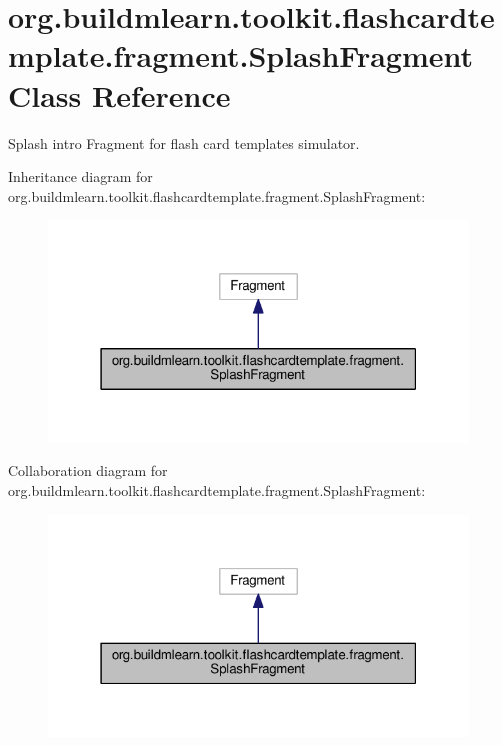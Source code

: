 \hypertarget{classorg_1_1buildmlearn_1_1toolkit_1_1flashcardtemplate_1_1fragment_1_1SplashFragment}{}\section{org.\+buildmlearn.\+toolkit.\+flashcardtemplate.\+fragment.\+Splash\+Fragment Class Reference}
\label{classorg_1_1buildmlearn_1_1toolkit_1_1flashcardtemplate_1_1fragment_1_1SplashFragment}


Splash intro Fragment for flash card template\textquotesingle{}s simulator.  




Inheritance diagram for org.\+buildmlearn.\+toolkit.\+flashcardtemplate.\+fragment.\+Splash\+Fragment\+:
\nopagebreak
\begin{figure}[H]
\begin{center}
\leavevmode
\includegraphics[width=316pt]{classorg_1_1buildmlearn_1_1toolkit_1_1flashcardtemplate_1_1fragment_1_1SplashFragment__inherit__graph}
\end{center}
\end{figure}


Collaboration diagram for org.\+buildmlearn.\+toolkit.\+flashcardtemplate.\+fragment.\+Splash\+Fragment\+:
\nopagebreak
\begin{figure}[H]
\begin{center}
\leavevmode
\includegraphics[width=316pt]{classorg_1_1buildmlearn_1_1toolkit_1_1flashcardtemplate_1_1fragment_1_1SplashFragment__coll__graph}
\end{center}
\end{figure}
